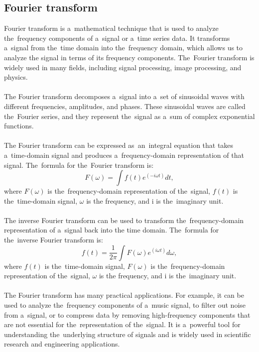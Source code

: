 \subsection{Fourier transform}\label{subsec:fourier}
Fourier transform is a~mathematical technique that is used to analyze the~frequency components of a~signal or a~time
series data. It transforms a~signal from the~time domain into the~frequency domain, which allows us to analyze the
signal in terms of its frequency components. The~Fourier transform is widely used in many fields, including signal
processing, image processing, and physics.\\
\\
The Fourier transform decomposes a~signal into a~set of sinusoidal waves with different frequencies, amplitudes, and phases.
These sinusoidal waves are called the~Fourier series, and they represent the~signal as a~sum of complex exponential functions.\\
\\
The Fourier transform can be expressed as~an~integral equation that takes a~time-domain signal and
produces a~frequency-domain representation of that signal. The~formula for the~Fourier transform is:\\
\begin{equation}
    F(\omega) = \int f(t) e^{(-i \omega t)} dt,
\end{equation}
where $F(\omega)$ is the~frequency-domain representation of the~signal, $f(t)$ is the~time-domain signal, $\omega$ is the
frequency, and i is the~imaginary unit.\\
\\
The inverse Fourier transform can be used to transform the~frequency-domain representation of a~signal back into the
time domain. The~formula for the~inverse Fourier transform is:
\begin{equation}
    f(t) = \frac{1}{2\pi} \int F(\omega) e^{(i \omega t)} d\omega,
\end{equation}
where $f(t)$ is the~time-domain signal, $F(\omega)$ is the~frequency-domain representation of the~signal, $\omega$ is the
frequency, and i is the~imaginary unit.\\
\\
The Fourier transform has many practical applications. For example, it can be used to analyze the~frequency components
of a~music signal, to filter out noise from a~signal, or to compress data by removing high-frequency components that
are not essential for the~representation of the~signal.  It is a~powerful tool for understanding the~underlying
structure of signals and is widely used in scientific research and engineering applications.

